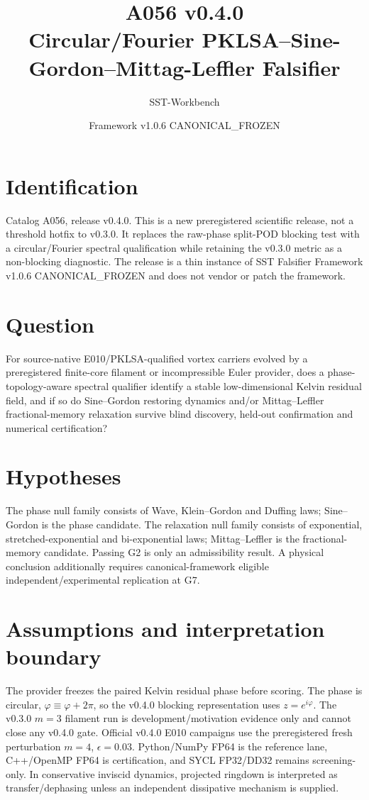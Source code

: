 \documentclass[11pt,a4paper]{article}
\title{A056 v0.4.0\\Circular/Fourier PKLSA--Sine-Gordon--Mittag-Leffler Falsifier}
\author{SST-Workbench}
\date{Framework v1.0.6 CANONICAL\_FROZEN}
\begin{document}
\maketitle

\section{Identification}
Catalog A056, release v0.4.0. This is a new preregistered scientific release, not a threshold hotfix to v0.3.0. It replaces the raw-phase split-POD blocking test with a circular/Fourier spectral qualification while retaining the v0.3.0 metric as a non-blocking diagnostic. The release is a thin instance of SST Falsifier Framework v1.0.6 CANONICAL\_FROZEN and does not vendor or patch the framework.

\section{Question}
For source-native E010/PKLSA-qualified vortex carriers evolved by a preregistered finite-core filament or incompressible Euler provider, does a phase-topology-aware spectral qualifier identify a stable low-dimensional Kelvin residual field, and if so do Sine--Gordon restoring dynamics and/or Mittag--Leffler fractional-memory relaxation survive blind discovery, held-out confirmation and numerical certification?

\section{Hypotheses}
The phase null family consists of Wave, Klein--Gordon and Duffing laws; Sine--Gordon is the phase candidate. The relaxation null family consists of exponential, stretched-exponential and bi-exponential laws; Mittag--Leffler is the fractional-memory candidate. Passing G2 is only an admissibility result. A physical conclusion additionally requires canonical-framework eligible independent/experimental replication at G7.

\section{Assumptions and interpretation boundary}
The provider freezes the paired Kelvin residual phase before scoring. The phase is circular, $\varphi\equiv\varphi+2\pi$, so the v0.4.0 blocking representation uses $z=e^{i\varphi}$. The v0.3.0 $m=3$ filament run is development/motivation evidence only and cannot close any v0.4.0 gate. Official v0.4.0 E010 campaigns use the preregistered fresh perturbation $m=4$, $\epsilon=0.03$. Python/NumPy FP64 is the reference lane, C++/OpenMP FP64 is certification, and SYCL FP32/DD32 remains screening-only. In conservative inviscid dynamics, projected ringdown is interpreted as transfer/dephasing unless an independent dissipative mechanism is supplied.
\end{document}
